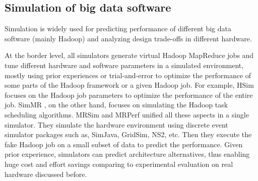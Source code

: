 \documentclass[journal]{IEEEtran}
\begin{document}

\subsection{Simulation of big data software}
Simulation is widely used for predicting performance of different big data software (mainly Hadoop) and analyzing design trade-offs in different hardware. 

At the border level, all simulators generate virtual Hadoop MapReduce jobs and tune different hardware and software parameters in a simulated environment, mostly using prior experiences or trial-and-error to optimize the performance of some parts of the Hadoop framework or a given Hadoop job. For example, HSim \cite{Simulator:liu2013hsim} focuses on the Hadoop job parameters to optimize the performance of the entire job. SimMR \cite{Simulator:verma2011play}, on the other hand, focuses on simulating the Hadoop task scheduling algorithms. MRSim\cite{Simulator:hammoud2010mrsim} and MRPerf \cite{Simulator:wang2009simulation} unified all these aspects in a single simulator. They simulate the hardware environment using discrete event simulator packages such as,  SimJava, GridSim, NS2, etc. Then  they execute the fake Hadoop job on a small subset of data to predict the performance. Given prior experience, simulators can predict architecture alternatives, thus enabling huge cost and effort savings comparing to experimental evaluation on real hardware discussed before. 
\end{document}
